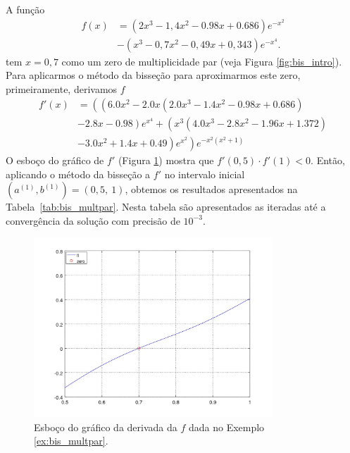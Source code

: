 \begin{ex}\label{ex:bis_multpar}
  A função
  \begin{align}
  f(x) &= (2x^3-1,4x^2-0.98x+0.686)e^{-x^2} \nonumber\\
       &- (x^3-0,7x^2-0,49x+0,343)e^{-x^4}.
  \end{align}
tem $x=0,7$ como um zero de multiplicidade par (veja Figura \ref{fig:bis_intro}). Para aplicarmos o método da bisseção para aproximarmos este zero, primeiramente, derivamos $f$
\begin{align}
  f'(x) &= \left(\left(6.0 x^{2} - 2.0 x \left(2.0 x^{3} - 1.4 x^{2} - 0.98 x + 0.686\right)\right.\right. \nonumber \\
        &\left.\left. - 2.8 x - 0.98\right) e^{x^{4}} + \left(x^{3} \left(4.0 x^{3} - 2.8 x^{2} - 1.96 x + 1.372\right)\right.\right.\nonumber\\
        &\left.\left.- 3.0 x^{2} + 1.4 x + 0.49\right) e^{x^{2}}\right) e^{- x^{2} \left(x^{2} + 1\right)}
\end{align}
O esboço do gráfico de $f'$ (Figura \ref{fig:bis_multpar}) mostra que $f'(0,5)\cdot f'(1) < 0$. Então, aplicando o método da bisseção a $f'$ no intervalo inicial $(a^{(1)}, b^{(1)}) = (0,5, ~1)$, obtemos os resultados apresentados na Tabela~\ref{tab:bis_multpar}. Nesta tabela são apresentados as iteradas até a convergência da solução com precisão de $10^{-3}$.

\begin{figure}[h!]
  \centering
  \includegraphics[width=0.8\textwidth]{./cap_eq1d/dados/ex_bis_multpar/fig_bis_multpar}
  \caption{Esboço do gráfico da derivada da $f$ dada no Exemplo \ref{ex:bis_multpar}.}
  \label{fig:bis_multpar}
\end{figure}
\end{ex}

